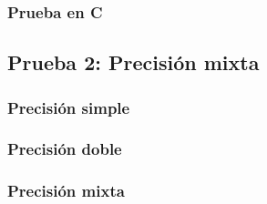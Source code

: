 \subsubsection{Prueba en C}


\newpage
\subsection{Prueba 2: Precisión mixta}
\label{prueba:mixta}
\subsubsection{Precisión simple}


\newpage
\subsubsection{Precisión doble}


\newpage
\subsubsection{Precisión mixta}

\fi